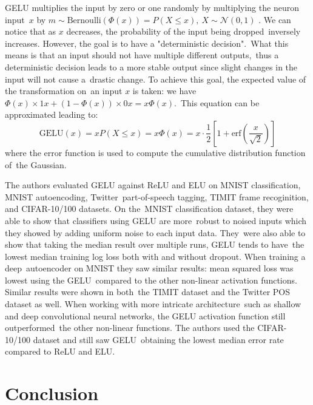 \documentclass[12pt]{article}
\begin{document}
\text{\newline}

GELU multiplies the input by zero or one randomly by multiplying the neuron input\
$x$ by \( m \sim  \text{Bernoulli}(\Phi(x))=P(X \leq x),\ X \sim \mathcal{N}(0,1)\)
.  We can notice that as $x$ decreases, the probability of the input being dropped\
inversely increases. However, the goal is to have a "deterministic decision".\
What this means is that an input should not have multiple different outputs,\
thus a deterministic decision leads to a more stable output since slight changes 
in the input will not cause a\
drastic change. To achieve this goal, the expected value of the transformation on\
an input $x$ is taken: we have \( \Phi(x) \times 1x + (1 - \Phi(x)) \times 0x = x\Phi(x) \).\
This equation can be approximated leading to:
\[
    \text{GELU}(x) = xP(X \leq x) = x\Phi(x) = x \cdot \frac{1}{2}\left [1 + \text{erf}
    \left(\frac{x}{\sqrt{2}}\right) \right]
\]
where the error function is used to compute the cumulative distribution function of\
the Gaussian.

\text{\newline}

The authors evaluated GELU against ReLU and ELU on MNIST classification, MNIST autoencoding, 
Twitter\ part-of-speech tagging, TIMIT frame recoginition, and CIFAR-10/100 datasets. On the\
MNIST classification dataset, they were able to show that classifiers using GELU are more\
robust to noised inputs which they showed by adding uniform noise to each input data. They\
were also able to show that taking the median result over multiple runs, GELU tends to have\
the lowest median training log loss both with and without dropout. When training a deep\
autoencoder on MNIST they saw similar results: mean squared loss was lowest using the GELU\
compared to the other non-linear activation functions. Similar results were shown in both\
the TIMIT dataset and the Twitter POS dataset as well. When working with more intricate architecture\
such as shallow and deep convolutional neural networks, the GELU activation function still outperformed\
the other non-linear functions. The authors used the CIFAR-10/100 dataset and still saw GELU\
obtaining the lowest median error rate compared to ReLU and ELU.


\section{Conclusion}
\end{document}
